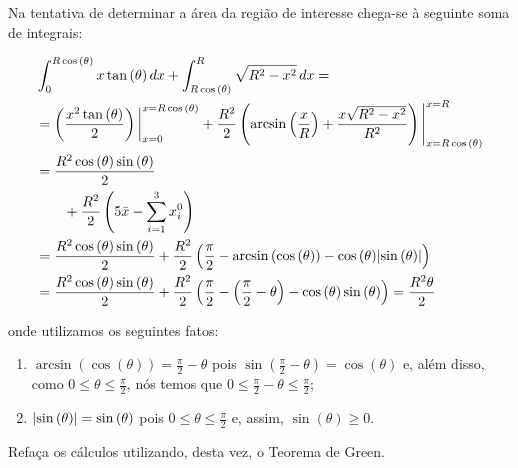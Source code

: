 


Na tentativa de determinar a área da região de interesse chega-se à seguinte
soma de integrais:

\begin{align*}
  &\int_{0}^{R\cos{(\theta)}}x\tan{(\theta)}\,dx
  +
  \int_{R\cos{(\theta)}}^{R}\sqrt{R^{2}-x^{2}}\,dx
  =
  \\
  &=
  \left(
    \frac{x^{2}\tan{(\theta)}}{2}
  \right)
  \bigg{\vert}_{x=0}^{x=R\cos{(\theta)}}
    +
  \frac{R^{2}}{2}
  \left(
    \arcsin{\left(\frac{x}{R}\right)}
    +
    \frac{x\sqrt{R^{2}-x^{2}}}{R^{2}}
  \right)
  \Bigg{\vert}_{x=R\cos{(\theta)}}^{x=R}
  \\
  &=
  \frac{R^{2}\cos{(\theta)\sin{(\theta)}}}{2}
  \\
  &\qquad
  +
  \frac{R^{2}}{2}
  \left(
    5\bar{x}
    -
    \sum_{i=1}^{3}x_{i}^{0}
  \right)
  \\
  &=
  \frac{R^{2}\cos{(\theta)\sin{(\theta)}}}{2}
  +
  \frac{R^{2}}{2}
  \left(
    \frac{\pi}{2}
    -
    \arcsin{(\cos{(\theta)})}
    -
    \cos{(\theta)}\lvert\sin{(\theta)}\rvert
  \right)
  \\
  &=
  \frac{R^{2}\cos{(\theta)\sin{(\theta)}}}{2}
  +
  \frac{R^{2}}{2}
  \left(
    \frac{\pi}{2}
    -
    \left(\frac{\pi}{2}-\theta\right)
    -
    \cos{(\theta)}\sin{(\theta)}
  \right)
  =
  \frac{R^{2}\theta}{2}
\end{align*}

onde utilizamos os seguintes fatos:

\begin{enumerate}
  \item
    \(\arcsin{(\cos{(\theta)})}=\frac{\pi}{2}-\theta\) pois
    \(\sin{(\frac{\pi}{2}-\theta)}=\cos{(\theta)}\) e, além disso, como
    \(0\leqslant{\theta}\leqslant{\frac{\pi}{2}}\), nós temos que
    \(0\leqslant{\frac{\pi}{2}-\theta}\leqslant{\frac{\pi}{2}}\);
  \item
    \(\lvert\sin{(\theta)}\rvert=\sin{(\theta)}\) pois
    \(0\leqslant{\theta}\leqslant{\frac{\pi}{2}}\) e, assim,
    \(\sin{(\theta)}\geqslant{0}\).
\end{enumerate}

\begin{remark}
  Refaça os cálculos utilizando, desta vez, o Teorema de Green.
\end{remark}
